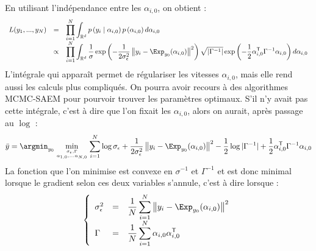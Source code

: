 En utilisant l'indépendance entre les $\alpha_{i,0}$, on obtient :
\begin{equation}
	\begin{array}{lll}
	L(y_1, ..., y_N)
	& = & \displaystyle \prod_{i=1}^N \int_{\R^d} p \left( y_i \mid \alpha_{i,0} \right) p \left( \alpha_{i,0} \right) d \alpha_{i,0} \\
	& \propto & \displaystyle \prod_{i=1}^N \int_{\R^d} \frac{1}{\sigma} \exp \left( - \frac{1}{2 \sigma_\epsilon^2} \left\| y_i - \Exp_{y_0}(\alpha_{i,0}) \right\|^2 \right) \sqrt{|\Gamma^{-1}|} \exp \left( - \frac{1}{2} \alpha_{i,0}^\trans \Gamma^{-1} \alpha_{i,0} \right) d \alpha_{i,0}
	\end{array}
\end{equation}
L'intégrale qui apparaît permet de régulariser les vitesses $\alpha_{i,0}$, mais elle rend aussi les calculs plus compliqués. On pourra avoir recours à des algorithmes MCMC-SAEM pour pourvoir trouver les paramètres optimaux. S'il n'y avait pas cette intégrale, c'est à dire que l'on fixait les $\alpha_{i,0}$, alors on aurait, après passage au $\log$ :
\begin{equation}
	\bar{y} = \argmin_{y_0} \min_{\sigma_\epsilon, \Gamma \atop \alpha_{1,0}, ... \alpha_{N,0}} \sum_{i=1}^N \log \sigma_\epsilon + \frac{1}{2 \sigma_\epsilon^2} \left\| y_i - \Exp_{y_0}(\alpha_{i,0}) \right\|^2 - \frac{1}{2} \log |\Gamma^{-1}| + \frac{1}{2} \alpha_{i,0}^\trans \Gamma^{-1} \alpha_{i,0}
\end{equation}
La fonction que l'on minimise est convexe en $\sigma^{-1}$ et $\Gamma^{-1}$ et est donc minimal lorsque le gradient selon ces deux variables s'annule, c'est à dire lorsque :
\begin{equation}
	\syst{lll}{
		\sigma_\epsilon^2 & = & \displaystyle \frac{1}{N} \sum_{i=1}^N \left\| y_i - \Exp_{y_0}(\alpha_{i,0}) \right\|^2 \\
		\Gamma & = & \displaystyle \frac{1}{N} \sum_{i=1}^N \alpha_{i,0} \alpha_{i,0}^\trans
	}
\end{equation}